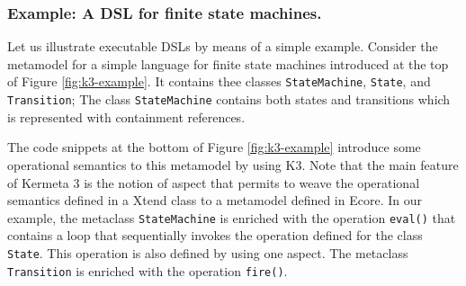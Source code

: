 

\vspace{-3mm}
\subsubsection{Example: A DSL for finite state machines.} Let us illustrate executable DSLs by means of a simple example. Consider the metamodel for a simple language for finite state machines introduced at the top of Figure \ref{fig:k3-example}. It contains thee classes \texttt{StateMachine}, \texttt{State}, and \texttt{Transition}; The class \texttt{StateMachine} contains both states and transitions which is represented with containment references.

The code snippets at the bottom of Figure \ref{fig:k3-example} introduce some operational semantics to this metamodel by using K3. Note that the main feature of Kermeta 3 is the notion of aspect that permits to weave the operational semantics defined in a Xtend class to a metamodel defined in Ecore. In our example, the metaclass \texttt{StateMachine} is enriched with the operation \texttt{eval()} that contains a loop that sequentially invokes the operation defined for the class \texttt{State}. This operation is also defined by using one aspect. The metaclass \texttt{Transition} is enriched with the operation \texttt{fire()}.

